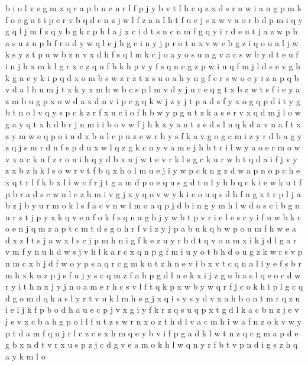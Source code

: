 \documentclass{article}
\begin{document}
b i o l v s g m x q r a p
b u e n r l f p
j y b v t l h c q z x d s r n w i a u g p m k f o e
g a t i p e r v b q d c n z j w l f
z a
n l h t f u e j s x w v a o r b d p m i q y g
q l j
m f z q y b g k r p h l a j x c i d t s n
c n m f g q y i r d e u t j a z w p h
a s u z n p b f r o d y w q l e j h g c i
n y j p r o t u x v w e b g z i q
o u a l j w k s y z t p
u w b z n v x d h f s q l m k c j o a
y o s u n g
v a c s w b y d t e u f i n j h x m k l g r
x c z q u f b k h p v
y f s q n c
g z p w i u q f m j l d s e v
g h k
g n e y k i p q d x o m b s w z r
z t x s u o a h y n
g f c r s w o e y i z n p q b v d a l h u m j t x k
y x m h w b c
s p l m v d y j u r e q g t x b z w
t s f i e y a z m b u g p x o w d
a x d n v i p c g q k w j z y
j t p a d s f y x o g
q p d i t
y
g b t n o l v q y s p c k z r f x u
c i o f h b w y p g u t z k a s e r v x q d m j l
o w g a y q t x h d b r j n m i
i b o v w f j h k x y a n t z e d s l
n q k d a
v n a f t x z y m w e q p o i u
d x b n l c p u z e w r h y s f k a v g o
g c m i z y r d b
a g y z q j s m r d n
f s p d u x w l q z g k c n y v a m e j h b t r i
l w y a o e r
m o w v x a c k n f z r
o n i h q y d b x u j w t e v r k l s g
c k u r w h t q d a i f j v y z x b
z h k l s o w
r v t f b q x h o l m u e j i y w p c k n g z d
w a p
n o p c h e x q t r l f
k b x l i w c f r j t g a m d p o e q u
s g d t n l y h b q c k i e w
k u t f p b r a d s c w n l e z h m i v g j x y q o
v w y k i c o u q s d h f n g x t r p l j a b z
j b y u r m o k l s f a c v n w
l m o a q p j d b i n g y
m h l w d o s c i b g n u r z t j p y x k q v e a f
o k f s q n a g h j y w b t p v r i c l e
s c y i f u w b k r o e n j q m z a p
t
c m t d s g o h r f v i z y j p a b u k q
b w p
o u m f h w e a d x z l t s j
a w x l s c j p m h n i g f k e z u y r b d t q v o
u m
x i k j d l g a r v m f y n u h
d w s j v h l k a r c x q n p g f m i u y o t b
h d o u g z k w r s v p n m c x b
j d f w o y p s a q r c g m k u t z h n e v i b x
v t c q n a l i y e f s b r m h x k u z p j
s f u j
y s c q m z f a h p g d l n e k x i j
z g u b a s l q e o c d w r y i t h n x j
y j n o a m e r h c s v l f t q k p x w b
y w q r f j c o k h i p l g
c q d g
o m d q k a s l y r
t v u k l m h e g j x q i s y
s y d v x a h b o n t m r q z u i e l j k f p
b o d h a u e c p j v x g i y f k r z q s
u q p x t g d l k a c b n z j e v
j e v x c b a h g p o i l f u t z s w r n
x o z t h d l v a
c m h i w a f n z
o k v w y p t d a m f q u j r l c z
c s x h m q e y b v i f p g a d k l w t n z
q c g
m a p d e g b x
n d t v
r x u s p z j c d g v e a m o k h l w q n y
r f b t v p n d i g s z h q a y k m l o
\end{document}

